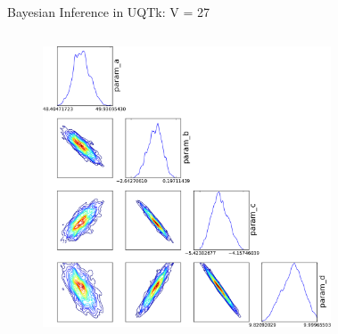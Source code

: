\documentclass[10pt]{beamer}
\begin{document}
\begin{frame}{Bayesian Inference in UQTk: V = 27}
	\begin{columns}[c]
			\begin{figure}
	 	 		\includegraphics[width=\textwidth]{V27abcd_posteriors}
	 		\end{figure} 	
	 		\begin{figure}[ht]
	 			\newline
	 			\newline

\end{figure}
\end{columns}
\end{frame}
\end{document}

